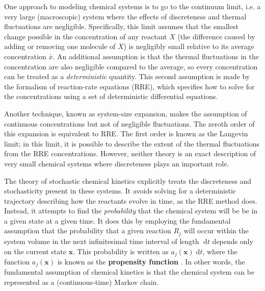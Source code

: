 \documentclass[english,letterpaper,12pt]{article}
\newcommand{\defkeywd}[1]{\textbf{#1}}
\newcommand{\dee}{\;\mathrm{d}}
\renewcommand{\vec}[1]{\ensuremath{\mathbf{#1}}}
\begin{document}
\begin{doublespacing}
One approach to modeling chemical systems is to go to the continuum limit, i.e. a very large (macroscopic) system where the effects of discreteness and thermal fluctuations are negligible. Specifically, this limit assumes that the smallest change possible in the concentration of any reactant $X$ (the difference caused by adding or removing one molecule of $X$) is negligibly small relative to its average concentration $\bar{x}$. An additional assumption is that the thermal fluctuations in the concentration are also negligible compared to the average, so every concentration can be treated as a \emph{deterministic} quantity. This second assumption is made by the formalism of reaction-rate equations (RRE), which specifies how to solve for the concentrations using a set of deterministic differential equations. 

Another technique, known as system-size expansion, makes the assumption of continuous concentrations but not of negligible fluctuations. The zeroth order of this expansion is equivalent to RRE. The first order is known as the Langevin limit; in this limit, it is possible to describe the extent of the thermal fluctuations from the RRE concentrations. However, neither theory is an exact description of very small chemical systems where discreteness plays an important role. 

The theory of stochastic chemical kinetics explicitly treats the discreteness and stochasticity present in these systems. It avoids solving for a deterministic trajectory describing how the reactants evolve in time, as the RRE method does. Instead, it attempts to find the \emph{probability} that the chemical system will be be in a given state at a given time. It does this by employing the fundamental assumption that the probability that a given reaction $R_j$ will occur within the system volume in the next infinitesimal time interval of length $\dee t$ depends only on the current state $\vec{x}$. This probability is written as $a_j(\vec{x}) \dee t$, where the function $a_j(\vec{x})$ is known as the \defkeywd{propensity function} \cite{gillespie-ssa}. In other words, the fundamental assumption of chemical kinetics is that the chemical system can be represented as a (continuous-time) Markov chain.


\end{doublespacing}
\end{document}
